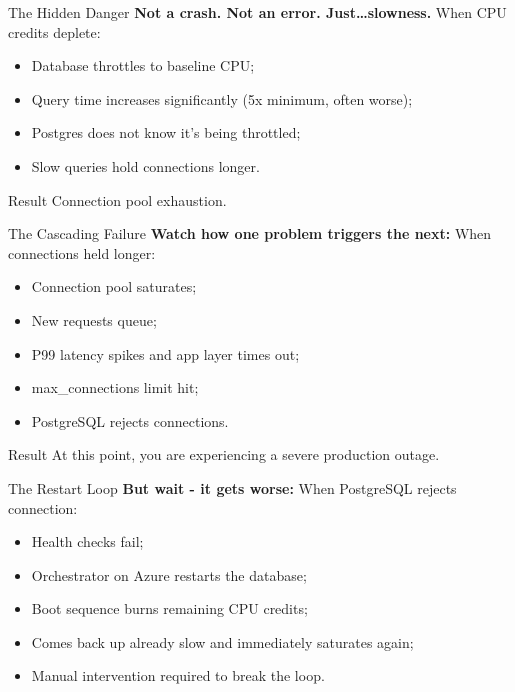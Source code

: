 \documentclass[11pt, aspectratio=169]{beamer}
\begin{document}
\begin{frame}{The Hidden Danger}
    \textbf{Not a crash. Not an error. Just\dots slowness.}
    \vfill
    When CPU credits deplete:
    \begin{itemize}
        \item Database throttles to baseline CPU;
        \item Query time increases significantly (5x minimum, often worse);
        \item Postgres does not know it's being throttled;
        \item Slow queries hold connections longer.
    \end{itemize}
    \vfill
    \begin{alertblock}{Result}
        Connection pool exhaustion.
    \end{alertblock}
\end{frame}

\begin{frame}{The Cascading Failure}
    \textbf{Watch how one problem triggers the next:} 
    \vfill
    When connections held longer:
    \begin{itemize}
        \item Connection pool saturates;
        \item New requests queue;
        \item P99 latency spikes and app layer times out;
        \item max\_connections limit hit;
        \item PostgreSQL rejects connections.
    \end{itemize}
    \vfill
    \begin{alertblock}{Result}
        At this point, you are experiencing a severe production outage.
    \end{alertblock}
\end{frame}

\begin{frame}{The Restart Loop}
    \textbf{But wait - it gets worse:}
    \vfill
    When PostgreSQL rejects connection:
    \begin{itemize}
        \item Health checks fail;
        \item Orchestrator on Azure restarts the database;
        \item Boot sequence burns remaining CPU credits;
        \item Comes back up already slow and immediately saturates again;
        \item Manual intervention required to break the loop.
    \end{itemize}
\end{frame}
\end{document}
